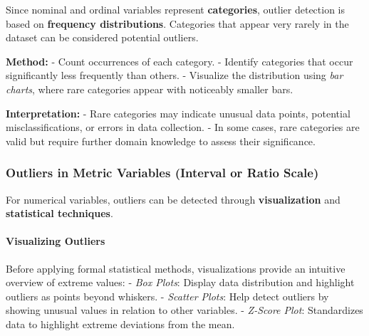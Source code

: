 \documentclass[12pt,openany]{book}
\begin{document}
Since nominal and ordinal variables represent \textbf{categories}, outlier detection 
is based on \textbf{frequency distributions}. Categories that appear very rarely in 
the dataset can be considered potential outliers.
\newline

\textbf{Method:}  
\newline
- Count occurrences of each category.  
- Identify categories that occur significantly less frequently than others.  
- Visualize the distribution using \textit{bar charts}, where rare categories 
  appear with noticeably smaller bars.
\newline

\textbf{Interpretation:}  
\newline
- Rare categories may indicate unusual data points, potential misclassifications, 
  or errors in data collection.  
- In some cases, rare categories are valid but require further domain knowledge 
  to assess their significance.  
\newline

\subsubsection{Outliers in Metric Variables (Interval or Ratio Scale)}

For numerical variables, outliers can be detected through \textbf{visualization} 
and \textbf{statistical techniques}.
\newline

\paragraph{Visualizing Outliers}
Before applying formal statistical methods, visualizations provide an intuitive 
overview of extreme values:
\newline
- \textit{Box Plots}: Display data distribution and highlight outliers as 
  points beyond whiskers.
\newline
- \textit{Scatter Plots}: Help detect outliers by showing unusual values in 
  relation to other variables.
\newline
- \textit{Z-Score Plot}: Standardizes data to highlight extreme deviations 
  from the mean.
\newline
\end{document}
